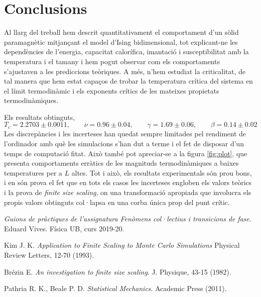 \documentclass[a4paper]{article}
\begin{document}
\newpage
\section{Conclusions}
Al llarg del treball hem descrit quantitativament el comportament d'un sòlid paramagnètic mitjançant el model d'Ising bidimensional, tot explicant-ne les dependències de l'energia, capacitat calorífica, imantació i susceptibilitat amb la temperatura i el tamany i hem pogut observar com els comportaments s'ajustaven a les prediccions teòriques. A més, n'hem estudiat la criticalitat, de tal manera que hem estat capaços de trobar la temperatura crítica del sistema en el límit termodinàmic i els exponents crítics de les mateixes propietats termodinàmiques.

Els resultats obtinguts,
\begin{equation*}
    T_c = 2.2703 \pm 0.0011, \qquad \nu = 0.96 \pm 0.04, \qquad \gamma = 1.69 \pm 0.06, \qquad \beta = 0.14 \pm 0.02
\end{equation*}
Les discrepàncies i les incerteses han quedat sempre limitades pel rendiment de l'ordinador amb què les simulacions s'han dut a terme i el fet de disposar d'un temps de computació fitat. Això també pot apreciar-se a la figura \ref{fig:plot}, que presenta comportaments erràtics de les magnituds termodinàmiques a baixes temperatures per a $L$ altes. Tot i això, els resultats experimentals són prou bons, i en són prova el fet que en tots els casos les incerteses engloben els valors teòrics i la prova de \textit{finite size scaling}, on una transformació apropiada que involucra els propis valors obtinguts col·lapsa en una corba única prop del punt crític.

\begin{thebibliography}{9}
\textit{Guions de pràctiques de l'assignatura Fenòmens col·lectius i transicions de fase}. Eduard Vives. Física UB, curs 2019-20.

Kim J. K. \textit{Application to Finite Scaling to Monte Carlo Simulations} Physical Review Letters, 12-70 (1993).

Brézin E. \textit{An investigation to finite size scaling}. J. Physique, 43-15 (1982).

Pathria R. K., Beale P. D. \textit{Statistical Mechanics}. Academic Press (2011).

\end{thebibliography}
\end{document}
